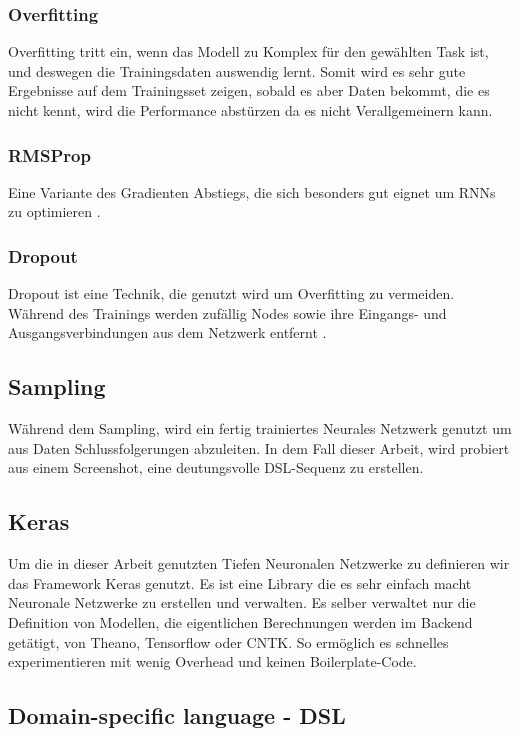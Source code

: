 \documentclass[pdftex,a4paper,halfparskip, article]{scrartcl}
\begin{document}
\subsubsection{Overfitting}
	
Overfitting tritt ein, wenn das Modell zu Komplex für den gewählten Task ist, und deswegen die Trainingsdaten auswendig lernt. Somit wird es sehr gute Ergebnisse auf dem Trainingsset zeigen, sobald es aber Daten bekommt, die es nicht kennt, wird die Performance abstürzen da es nicht Verallgemeinern kann.

\subsubsection{RMSProp}

Eine Variante des Gradienten Abstiegs, die sich besonders gut eignet um RNNs zu optimieren \cite{kerasDocRMSprob}.

\subsubsection{Dropout}

Dropout ist eine Technik, die genutzt wird um Overfitting zu vermeiden. Während des Trainings werden zufällig Nodes sowie ihre Eingangs- und Ausgangsverbindungen aus dem Netzwerk entfernt \cite{JMLR:v15:srivastava14a}.


\subsection{Sampling}
Während dem Sampling, wird ein fertig trainiertes Neurales Netzwerk genutzt um aus Daten Schlussfolgerungen abzuleiten. In dem Fall dieser Arbeit, wird probiert aus einem Screenshot, eine deutungsvolle DSL-Sequenz zu erstellen.

\subsection{Keras}
Um die in dieser Arbeit genutzten Tiefen Neuronalen Netzwerke zu definieren wir das Framework Keras genutzt. Es ist eine Library die es sehr einfach macht Neuronale Netzwerke zu erstellen und verwalten. Es selber verwaltet nur die Definition von Modellen, die eigentlichen Berechnungen werden im Backend getätigt, von Theano, Tensorflow oder CNTK. So ermöglich es schnelles experimentieren mit wenig Overhead und keinen Boilerplate-Code. 

\subsection{Domain-specific language - DSL}
\end{document}
